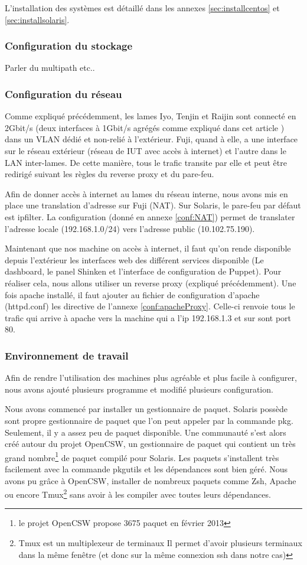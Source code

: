 \documentclass[a4paper,oneside]{report}
\begin{document}
L'installation des systèmes est détaillé dans les annexes \ref{sec:installcentos} et \ref{sec:installsolaris}.

\subsubsection{Configuration du stockage}
Parler du multipath etc..

\subsubsection{Configuration du réseau}
Comme expliqué précédemment, les lames Iyo, Tenjin et Raijin sont connecté en 2Gbit/s (deux interfaces à 1Gbit/s agrégés comme expliqué dans cet article \cite{SolarisLA}) dans un VLAN dédié et non-relié à l'extérieur.
Fuji, quand à elle, a une interface sur le réseau extérieur (réseau de IUT avec accès à internet) et l'autre dans le LAN inter-lames.
De cette manière, tous le trafic transite par elle et peut être redirigé suivant les règles du reverse proxy et du pare-feu. 

Afin de donner accès à internet au lames du réseau interne, nous avons mis en place une translation d'adresse sur Fuji (NAT).
Sur Solaris, le pare-feu par défaut est ipfilter. La configuration (donné en annexe \ref{conf:NAT}) permet de translater l'adresse locale (192.168.1.0/24) vers l'adresse public (10.102.75.190).

Maintenant que nos machine on accès à internet, il faut qu'on rende disponible depuis l'extérieur les interfaces web des différent services disponible (Le dashboard, le panel Shinken et l'interface de configuration de Puppet).
Pour réaliser cela, nous allons utiliser un reverse proxy (expliqué précédemment). Une fois apache installé, il faut ajouter au fichier de configuration d'apache (httpd.conf) les directive de l'annexe \ref{conf:apacheProxy}.
Celle-ci renvoie tous le trafic qui arrive à apache vers la machine qui a l'ip 192.168.1.3 et sur sont port 80.

\subsubsection{Environnement de travail}
Afin de rendre l'utilisation des machines plus agréable et plus facile à configurer, nous avons ajouté plusieurs programme et modifié plusieurs configuration.

Nous avons commencé par installer un gestionnaire de paquet.
Solaris possède sont propre gestionnaire de paquet que l'on peut appeler par la commande pkg. Seulement, il y a assez peu de paquet disponible.
Une communauté s'est alors créé autour du projet OpenCSW, un gestionnaire de paquet qui contient un très grand nombre\footnote{le projet OpenCSW propose 3675 paquet en février 2013} de paquet compilé pour Solaris.
Les paquets s'installent très facilement avec la commande pkgutils et les dépendances sont bien géré. Nous avons pu grâce à OpenCSW, installer de nombreux paquets comme Zsh, Apache ou encore Tmux\footnote{Tmux est un multiplexeur de terminaux
Il permet d'avoir plusieurs terminaux dans la même fenêtre (et donc sur la même connexion \gls{ssh} dans notre cas)} sans avoir à les compiler avec toutes leurs dépendances. 
\end{document}
